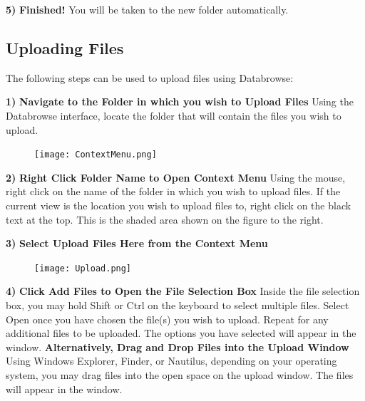 \documentclass[10pt]{article}
\begin{document}
\noindent\textbf{5)} \textbf{Finished!} \newline You will be taken to the new folder automatically.

\clearpage
\subsection{Uploading Files}

The following steps can be used to upload files using Databrowse:

\begin{changemargin}{0in}{150.4pt}
\noindent\textbf{1)} \textbf{Navigate to the Folder in which you wish to Upload Files} \newline Using the Databrowse interface, locate the folder that will contain the files you wish to upload.
\end{changemargin}

\begingroup
\setlength\intextsep{0pt}
\begin{figure}
		\texttt{[image: ContextMenu.png]}
\end{figure}
\noindent\textbf{2)} \textbf{Right Click Folder Name to Open Context Menu} \newline Using the mouse, right click on the name of the folder in which you wish to upload files.  If the current view is the location you wish to upload files to, right click on the black text at the top.  This is the shaded area shown on the figure to the right.

\endgroup

\hfill \break
\hfill \break
\hfill \break
\hfill \break
\hfill \break
\hfill \break

\begin{changemargin}{0in}{150.4pt}
\noindent\textbf{3)} \textbf{Select Upload Files Here from the Context Menu}
\end{changemargin}

\begingroup
\setlength\intextsep{0pt}
\begin{figure}
		\texttt{[image: Upload.png]}
\end{figure}
\noindent\textbf{4)} \textbf{Click Add Files to Open the File Selection Box} \newline Inside the file selection box, you may hold Shift or Ctrl on the keyboard to select multiple files.  Select Open once you have chosen the file(s) you wish to upload.  Repeat for any additional files to be uploaded.  The options you have selected will appear in the window. \newline\newline \textbf{Alternatively, Drag and Drop Files into the Upload Window} \newline Using Windows Explorer, Finder, or Nautilus, depending on your operating system, you may drag files into the open space on the upload window.  The files will appear in the window. 
\end{document}
